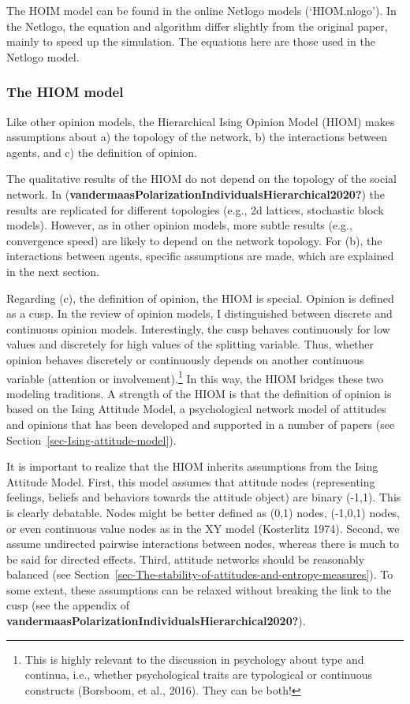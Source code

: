 \documentclass[
  a4paper,
  DIV=11,
  numbers=noendperiod]{scrreprt}
\begin{document}
The HOIM model can be found in the online Netlogo models (`HIOM.nlogo').
In the Netlogo, the equation and algorithm differ slightly from the
original paper, mainly to speed up the simulation. The equations here
are those used in the Netlogo model.

\hypertarget{sec-The-HIOM-model}{%
\subsubsection{The HIOM model}\label{sec-The-HIOM-model}}

Like other opinion models, the Hierarchical Ising Opinion Model (HIOM)
makes assumptions about a) the topology of the network, b) the
interactions between agents, and c) the definition of opinion.

The qualitative results of the HIOM do not depend on the topology of the
social network. In
(\textbf{vandermaasPolarizationIndividualsHierarchical2020?}) the
results are replicated for different topologies (e.g., 2d lattices,
stochastic block models). However, as in other opinion models, more
subtle results (e.g., convergence speed) are likely to depend on the
network topology. For (b), the interactions between agents, specific
assumptions are made, which are explained in the next section.

Regarding (c), the definition of opinion, the HIOM is special. Opinion
is defined as a cusp. In the review of opinion models, I distinguished
between discrete and continuous opinion models. Interestingly, the cusp
behaves continuously for low values and discretely for high values of
the splitting variable. Thus, whether opinion behaves discretely or
continuously depends on another continuous variable (attention or
involvement).\footnote{This is highly relevant to the discussion in
  psychology about type and continua, i.e., whether psychological traits
  are typological or continuous constructs (Borsboom, et al., 2016).
  They can be both!} In this way, the HIOM bridges these two modeling
traditions. A strength of the HIOM is that the definition of opinion is
based on the Ising Attitude Model, a psychological network model of
attitudes and opinions that has been developed and supported in a number
of papers (see Section~\ref{sec-Ising-attitude-model}).

It is important to realize that the HIOM inherits assumptions from the
Ising Attitude Model. First, this model assumes that attitude nodes
(representing feelings, beliefs and behaviors towards the attitude
object) are binary (-1,1). This is clearly debatable. Nodes might be
better defined as (0,1) nodes, (-1,0,1) nodes, or even continuous value
nodes as in the XY model (Kosterlitz 1974). Second, we assume undirected
pairwise interactions between nodes, whereas there is much to be said
for directed effects. Third, attitude networks should be reasonably
balanced (see
Section~\ref{sec-The-stability-of-attitudes-and-entropy-measures}). To
some extent, these assumptions can be relaxed without breaking the link
to the cusp (see the appendix of
\textbf{vandermaasPolarizationIndividualsHierarchical2020?}).
\end{document}
